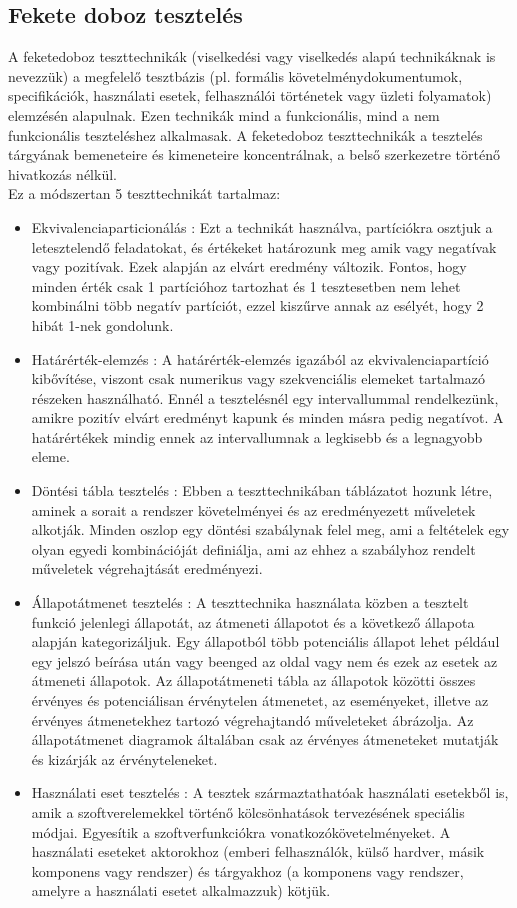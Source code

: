 \subsection{Fekete doboz tesztelés} A feketedoboz teszttechnikák (viselkedési vagy viselkedés alapú technikáknak is nevezzük) a megfelelő
tesztbázis (pl. formális követelménydokumentumok, specifikációk, használati esetek, felhasználói történetek
vagy üzleti folyamatok) elemzésén alapulnak. Ezen technikák mind a funkcionális, mind a nem funkcionális
teszteléshez alkalmasak. A feketedoboz teszttechnikák a tesztelés tárgyának bemeneteire és kimeneteire
koncentrálnak, a belső szerkezetre történő hivatkozás nélkül.\\
Ez a módszertan 5 teszttechnikát tartalmaz:
\begin{itemize}
\item Ekvivalenciaparticionálás : Ezt a technikát használva, partíciókra osztjuk a letesztelendő feladatokat, és értékeket határozunk meg amik vagy negatívak vagy pozitívak. Ezek alapján az elvárt eredmény változik. Fontos, hogy minden érték csak 1 partícióhoz tartozhat és 1 tesztesetben nem lehet kombinálni több negatív partíciót, ezzel kiszűrve annak az esélyét, hogy 2 hibát 1-nek gondolunk.
\item Határérték-elemzés : A határérték-elemzés igazából az ekvivalenciapartíció kibővítése, viszont csak numerikus vagy szekvenciális elemeket tartalmazó részeken használható. Ennél a tesztelésnél egy intervallummal rendelkezünk, amikre pozitív elvárt eredményt kapunk és minden másra pedig negatívot. A határértékek mindig ennek az intervallumnak a legkisebb és a legnagyobb eleme.
\item Döntési tábla tesztelés : Ebben a teszttechnikában táblázatot hozunk létre, aminek a sorait a rendszer követelményei és az eredményezett műveletek alkotják. Minden oszlop egy döntési szabálynak felel meg, ami a feltételek egy olyan egyedi kombinációját definiálja, ami az ehhez a szabályhoz rendelt műveletek végrehajtását eredményezi.
\item Állapotátmenet tesztelés : A teszttechnika használata közben a tesztelt funkció jelenlegi állapotát, az átmeneti állapotot és a következő állapota alapján kategorizáljuk. Egy állapotból több potenciális állapot lehet például egy jelszó beírása után vagy beenged az oldal vagy nem és ezek az esetek az átmeneti állapotok. Az állapotátmeneti tábla az állapotok közötti összes érvényes és potenciálisan érvénytelen átmenetet, az eseményeket, illetve az érvényes átmenetekhez tartozó végrehajtandó műveleteket ábrázolja. Az állapotátmenet diagramok általában csak az érvényes átmeneteket mutatják és kizárják az érvényteleneket.
\item Használati eset tesztelés : A tesztek származtathatóak használati esetekből is, amik a szoftverelemekkel történő kölcsönhatások tervezésének speciális módjai. Egyesítik a szoftverfunkciókra vonatkozókövetelményeket. A használati eseteket aktorokhoz (emberi felhasználók, külső hardver, másik komponens vagy rendszer) és tárgyakhoz (a komponens vagy rendszer, amelyre a használati esetet alkalmazzuk) kötjük.
\end{itemize}\cite{syllabus2}

